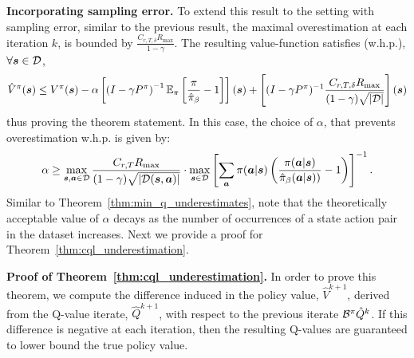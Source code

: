 \textbf{Incorporating sampling error.} To extend this result to the setting with sampling error, similar to the previous result, the maximal overestimation at each iteration $k$, is bounded by $\frac{C_{r, T, \delta} R_{\max}}{1 - \gamma}$.
The resulting value-function satisfies (w.h.p.), $\forall \boldsymbol{s} \in \mathcal{D}$, 
\begin{equation*}
   \hat{V}^\pi(\boldsymbol{s}) \leq V^\pi(\boldsymbol{s}) - \alpha \left[\left(I - \gamma P^\pi \right)^{-1} \mathbb{E}_{\pi}\left[\frac{\pi}{\hat{\pi}_\beta} - 1 \right] \right](\boldsymbol{s}) + \left[ (I - \gamma P^\pi)^{-1} \frac{C_{r, T, \delta} R_{\max}}{(1- \gamma) \sqrt{|\mathcal{D}|}}\right](\boldsymbol{s})
\end{equation*}
thus proving the theorem statement. In this case, the choice of $\alpha$, that prevents overestimation w.h.p. is given by:
\begin{equation*}
    \alpha \geq \max_{\boldsymbol{s}, \boldsymbol{a} \in \mathcal{D}} \frac{C_{r, T} R_{\max}}{(1 - \gamma) \sqrt{|\mathcal{D}(\boldsymbol{s}, \boldsymbol{a})|}} \cdot \max_{\boldsymbol{s} \in \mathcal{D}} \left[\sum_{\boldsymbol{a}} \pi(\boldsymbol{a}|\boldsymbol{s}) \left(\frac{\pi(\boldsymbol{a}|\boldsymbol{s})}{\hat{\pi}_\beta(\boldsymbol{a}|\boldsymbol{s}))} - 1\right)\right]^{-1}.
\end{equation*}
Similar to Theorem~\ref{thm:min_q_underestimates}, note that the theoretically acceptable value of $\alpha$ decays as the number of occurrences of a state action pair in the dataset increases.
Next we provide a proof for Theorem~\ref{thm:cql_underestimation}.

\textbf{Proof of Theorem~\ref{thm:cql_underestimation}.} In order to prove this theorem, we compute the difference induced in the policy value, $\hat{V}^{k+1}$, derived from the Q-value iterate, $\hat{Q}^{k+1}$, with respect to the previous iterate $\mathcal{B}^\pi \hat{Q}^{k}$. If this difference is negative at each iteration, then the resulting Q-values are guaranteed to lower bound the true policy value.

